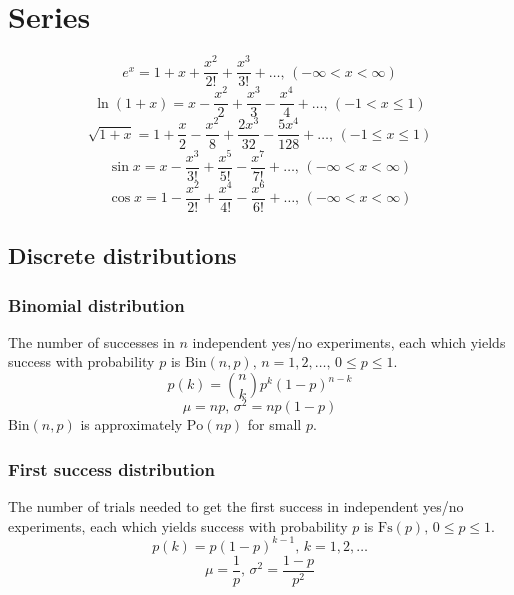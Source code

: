 \section{Series}
$$e^x = 1+x+\frac{x^2}{2!}+\frac{x^3}{3!}+\dots,\,(-\infty<x<\infty)$$
$$\ln(1+x) = x-\frac{x^2}{2}+\frac{x^3}{3}-\frac{x^4}{4}+\dots,\,(-1<x\leq1)$$
$$\sqrt{1+x} = 1+\frac{x}{2}-\frac{x^2}{8}+\frac{2x^3}{32}-\frac{5x^4}{128}+\dots,\,(-1\leq x\leq1)$$
$$\sin x = x-\frac{x^3}{3!}+\frac{x^5}{5!}-\frac{x^7}{7!}+\dots,\,(-\infty<x<\infty)$$
$$\cos x = 1-\frac{x^2}{2!}+\frac{x^4}{4!}-\frac{x^6}{6!}+\dots,\,(-\infty<x<\infty)$$



\subsection{Discrete distributions}

\subsubsection{Binomial distribution}
The number of successes in $n$ independent yes/no experiments, each which yields success with probability $p$ is $\textrm{Bin}(n,p),\,n=1,2,\dots,\, 0\leq p\leq1$.
\[p(k)=\binom{n}{k}p^k(1-p)^{n-k}\]
\[\mu = np,\,\sigma^2=np(1-p)\]
$\textrm{Bin}(n,p)$ is approximately $\textrm{Po}(np)$ for small $p$.

\subsubsection{First success distribution}
The number of trials needed to get the first success in independent yes/no experiments, each which yields success with probability $p$ is $\textrm{Fs}(p),\,0\leq p\leq1$.
\[p(k)=p(1-p)^{k-1},\,k=1,2,\dots\]
\[\mu = \frac1p,\,\sigma^2=\frac{1-p}{p^2}\]

